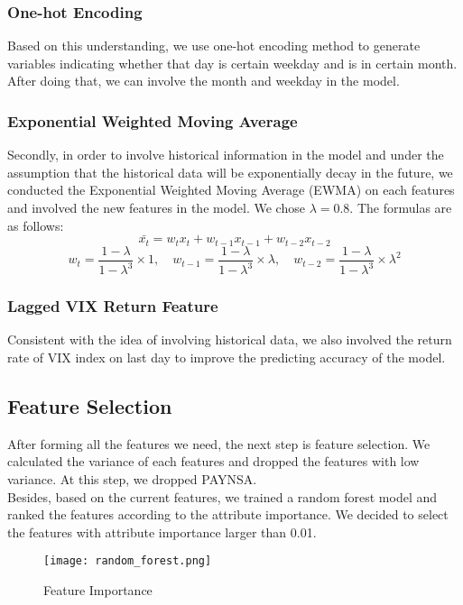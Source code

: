 \documentclass[fleqn,10pt]{SelfArx} %
\begin{document}
\subsubsection*{One-hot Encoding}
Based on this understanding, we use one-hot encoding method to generate variables indicating whether that day is certain weekday and is in certain month. After doing that, we can involve the month and weekday in the model.
\subsubsection*{Exponential Weighted Moving Average}
Secondly, in order to involve historical information in the model and under the assumption that the historical data will be exponentially decay in the future, we conducted the Exponential Weighted Moving Average (EWMA) on each features and involved the new features in the model. We chose $\lambda = 0.8$. The formulas are as follows:
$$\bar{x_t} = w_tx_t + w_{t-1}x_{t-1} + w_{t-2}x_{t-2}$$
$$w_t = \frac{1-\lambda}{1-\lambda^3}\times1, \quad w_{t-1} = \frac{1-\lambda}{1-\lambda^3}\times\lambda, \quad w_{t-2} = \frac{1-\lambda}{1-\lambda^3}\times\lambda^2$$
\subsubsection*{Lagged VIX Return Feature}
Consistent with the idea of involving historical data, we also involved the return rate of VIX index on last day to improve the predicting accuracy of the model.

\subsection{Feature Selection}
\noindent
After forming all the features we need, the next step is feature selection. We calculated the variance of each features and dropped the features with low variance. At this step, we dropped PAYNSA.\\

\noindent
Besides, based on the current features, we trained a random forest model and ranked the features according to the attribute importance. We decided to select the features with attribute importance larger than 0.01.

\begin{figure}[ht]\centering %
\texttt{[image: random\_forest.png]}
\caption{Feature Importance}
\label{fig:view}
\end{figure}
\end{document}
